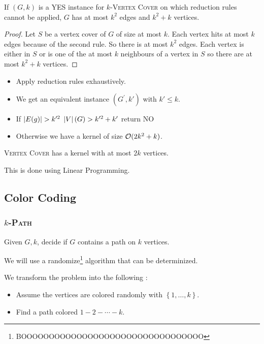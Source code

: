 \documentclass[12pt]{cours}
\begin{document}
\begin{lemma}
    If $(G, k)$ is a YES instance for $k$-\textsc{Vertex Cover} on which reduction rules cannot be applied, $G$ has at most $k^{2}$ edges and $k^{2} + k$ vertices.
\end{lemma}
\begin{proof}
    Let $S$ be a vertex cover of $G$ of size at most $k$. Each vertex hits at most $k$ edges because of the second rule. So there is at most $k^{2}$ edges. Each vertex is either in $S$ or is one of the at most $k$ neighbours of a vertex in $S$ so there are at most $k^{2} + k$ vertices.
\end{proof}

\begin{proposition}
    \begin{itemize}
        \item Apply reduction rules exhaustively.
        \item We get an equivalent instance $(G^{'}, k')$ with $k' \leq k$.
        \item If $\left|E(g)\right| > k'^{2}$ $\left|V\right|(G) > k'^{2} + k'$ return NO
        \item Otherwise we have a kernel of size $\mathcal{O}(2k^{2} + k)$.
    \end{itemize}
\end{proposition}

\begin{theorem}
    \textsc{Vertex Cover} has a kernel with at most $2k$ vertices.
\end{theorem}
This is done using Linear Programming.

\subsection{Color Coding}
\subsubsection{$k$-\textsc{Path}}
\begin{definition}
    Given $G, k$, decide if $G$ contains a path on $k$ vertices.
\end{definition}

We will use a randomize\footnote{BOOOOOOOOOOOOOOOOOOOOOOOOOOOOOOOOO} algorithm that can be determinized.

We transform the problem into the following :
\begin{itemize}
    \item Assume the vertices are colored randomly with $\left\{1, \ldots, k\right\}$.
    \item Find a path colored $1 - 2 - \cdots - k$.
\end{itemize}
\end{document}
